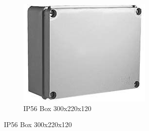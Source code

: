 \documentclass[a4paper]{article}
\begin{document}
\vspace{0.5cm}

\begin{figure}
        \centering
        \begin{subfigure}[b]{0.3\textwidth}
                \includegraphics[width=\textwidth]{figures/Box.jpg}
                \caption*{IP56 Box 300x220x120 }
        \end{subfigure}
\end{figure}
\end{document}
